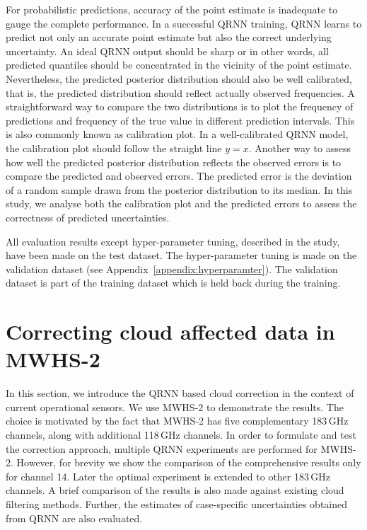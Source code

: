 \documentclass[amt, manuscript]{copernicus}
\begin{document}
For probabilistic predictions, accuracy of the point estimate is inadequate to
gauge the complete performance. In a successful QRNN training, QRNN learns to
predict not only an accurate point estimate but also the correct underlying
uncertainty. An ideal QRNN output should be sharp or in other words, all
predicted quantiles should be concentrated in the vicinity of the point
estimate. Nevertheless, the predicted posterior distribution should also be
well calibrated, that is, the predicted distribution should reflect actually
observed frequencies. A straightforward way to compare the two distributions is
to plot the frequency of predictions and frequency of the true value in
different prediction intervals. This is also commonly known as calibration plot.
In a well-calibrated QRNN model, the calibration plot should follow the straight
line $y = x$. Another way to assess how well the predicted posterior distribution
reflects the observed errors is to compare the predicted and observed errors.
The predicted error is the deviation of a random sample drawn from the posterior
distribution to its median. In this study, we analyse both the calibration plot
and the predicted errors to assess the correctness of predicted uncertainties.  

All evaluation results except hyper-parameter tuning, described in the study, have been made on the test dataset. The hyper-parameter tuning is made on the validation dataset (see Appendix~\ref{appendix:hyperparamter}). The validation dataset is part of the training dataset which is held back during the training.


\section{Correcting cloud affected data in MWHS-2}
\label{qrnn_mwhs}
%
In this section, we introduce the QRNN based cloud correction in the context of current operational sensors.  We use MWHS-2 to demonstrate the results. The choice is motivated by the fact that MWHS-2 has five complementary 183\,GHz channels, along with additional 118\,GHz channels. In order to formulate and test the correction approach, multiple QRNN experiments are performed for MWHS-2. However, for brevity we show the comparison of the comprehensive results only for channel 14. Later the optimal experiment is extended to other 183\,GHz channels. A brief comparison of the results is also made against existing cloud filtering methods. Further, the estimates of case-specific uncertainties obtained from QRNN are also evaluated.
\end{document}
